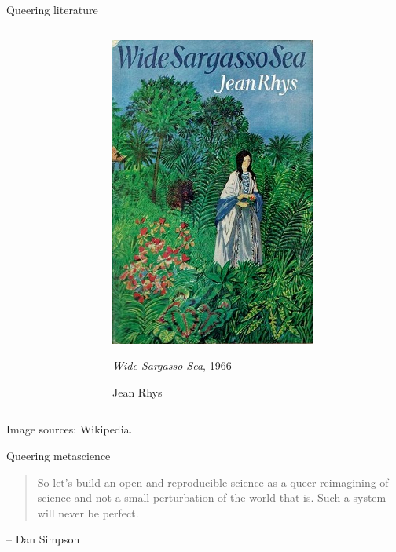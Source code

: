 \documentclass{beamer}
\begin{document}
\begin{frame}{Queering literature}
\begin{centering}
\begin{columns}
\begin{column}{0.5\textwidth}
\end{column}

\begin{column}{0.5\textwidth}


\includegraphics[scale=0.55]{JeanRhys_WideSargassoSea.jpg}
\medskip

\small{
\emph{Wide Sargasso Sea}, 1966

\medskip

Jean Rhys~\cite{rhys1992wide}
}


\end{column}

\end{columns}

\begin{flushright}
\tiny{Image sources: Wikipedia.}
\end{flushright}





\end{centering}

\end{frame}

\begin{frame}{Queering metascience}

    \begin{quote}
        So let’s build an open and reproducible science as a queer reimagining of science and not a small perturbation of the world that is. Such a system will never be perfect.
    \end{quote}

\begin{flushright}
-- Dan Simpson~\cite{simpson_what_2019}
\end{flushright}

\end{frame}
\end{document}
